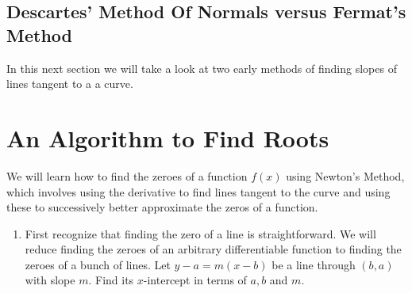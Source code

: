 \documentclass{amsbook}
\begin{document}
    	\subsection*{Descartes' Method Of Normals versus Fermat's Method}
    	In this next section we will take a look at two early methods of finding slopes of lines tangent to a a curve.
    		
\newpage		
    \section*{An Algorithm to Find Roots}
   We will learn how to find the zeroes of a function $f(x)$ using Newton's Method, which involves using the derivative to find lines tangent to the curve and using these to successively better approximate the zeros of a function. 
    \begin{enumerate}
    	\item First recognize that finding the zero of a line is straightforward. We will reduce finding the zeroes of an arbitrary differentiable function to finding the zeroes of a bunch of lines. Let $y-a=m(x-b)$ be a line through $(b,a)$  with slope $m$. Find its $x$-intercept in terms of $a, b$ and $m$.\\
    	

\end{enumerate}
\end{document}
